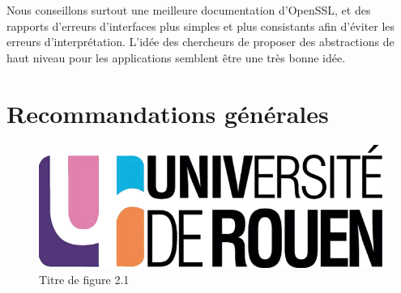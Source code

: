 			Nous conseillons surtout une meilleure documentation d'OpenSSL, et des rapports d'erreurs d'interfaces plus simples et plus consistants afin d'éviter les erreurs d'interprétation. L'idée des chercheurs de proposer des abstractions de haut niveau pour les applications semblent être une très bonne idée.
		
		


\section{Recommandations générales}




\begin{figure}[H]
	\centering
	\includegraphics[scale=0.2]{images/logo_univ.png}
	\caption{Titre de figure 2.1}
	\label{fig21}
\end{figure}